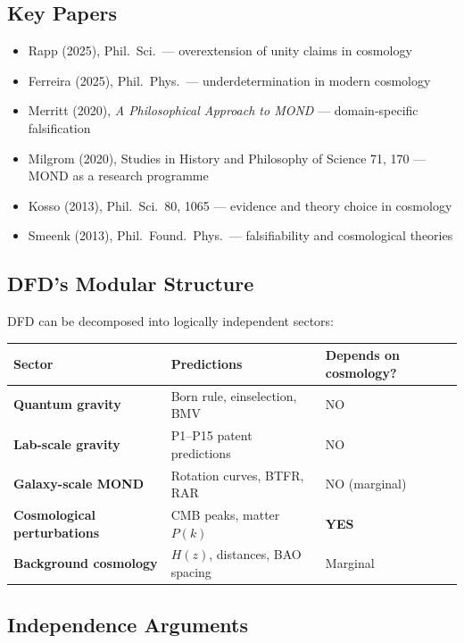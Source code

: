 \documentclass[11pt,a4paper]{article}
\begin{document}
\subsection{Key Papers}

\begin{itemize}
\item Rapp (2025), Phil.\ Sci.\ --- overextension of unity claims in cosmology
\item Ferreira (2025), Phil.\ Phys.\ --- underdetermination in modern cosmology
\item Merritt (2020), \emph{A Philosophical Approach to MOND} --- domain-specific falsification
\item Milgrom (2020), Studies in History and Philosophy of Science 71, 170 --- MOND as a research programme
\item Kosso (2013), Phil.\ Sci.\ 80, 1065 --- evidence and theory choice in cosmology
\item Smeenk (2013), Phil.\ Found.\ Phys.\ --- falsifiability and cosmological theories
\end{itemize}

\subsection{DFD's Modular Structure}

DFD can be decomposed into logically independent sectors:

\begin{center}
\begin{tabular}{lll}
\toprule
\textbf{Sector} & \textbf{Predictions} & \textbf{Depends on cosmology?} \\
\midrule
\textbf{Quantum gravity} & Born rule, einselection, BMV & NO \\
\textbf{Lab-scale gravity} & P1--P15 patent predictions & NO \\
\textbf{Galaxy-scale MOND} & Rotation curves, BTFR, RAR & NO (marginal) \\
\textbf{Cosmological perturbations} & CMB peaks, matter $P(k)$ & \textbf{YES} \\
\textbf{Background cosmology} & $H(z)$, distances, BAO spacing & Marginal \\
\bottomrule
\end{tabular}
\end{center}

\subsection{Independence Arguments}
\end{document}
